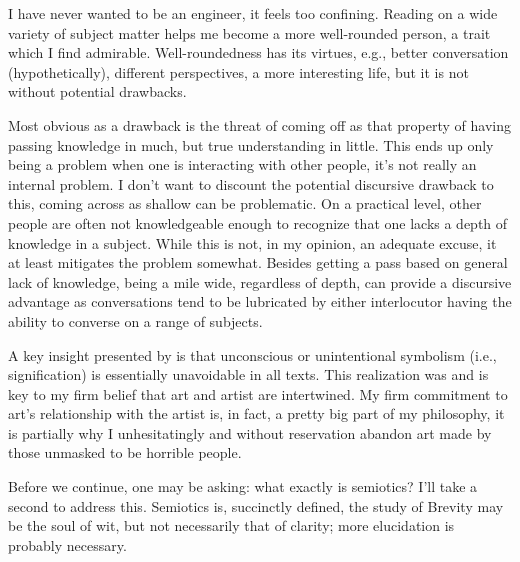 \documentclass[../butidigress.tex]{subfiles}
\begin{document}
I have never wanted to be  an engineer, it feels too confining.
Reading on a wide variety of subject matter helps me become a more well-rounded person, a trait which I find admirable.
Well-roundedness has its virtues, e.g., better conversation (hypothetically), different perspectives, a more interesting life, but it is not without potential drawbacks.

Most obvious as a drawback is the threat of coming off as  that property of having passing knowledge in much, but true understanding in little.
This ends up only being a problem when one is interacting with other people, it's not really an internal problem.
I don't want to discount the potential discursive drawback to this, coming across as shallow can be problematic.
On a practical level, other people are often not knowledgeable enough to recognize that one lacks a depth of knowledge in a subject.
While this is not, in my opinion, an adequate excuse, it at least mitigates the problem somewhat.
Besides getting a pass based on general lack of knowledge, being a mile wide, regardless of depth, can provide a discursive advantage as conversations tend to be lubricated by either interlocutor having the ability to converse on a range of subjects.

A key insight presented by  is that unconscious or unintentional symbolism (i.e., signification) is essentially unavoidable in all texts.
This realization was and is key to my firm belief that art and artist are intertwined.
My firm commitment to art's relationship with the artist is, in fact, a pretty big part of my philosophy, it is partially why I unhesitatingly and without reservation abandon art made by those unmasked to be horrible people.

Before we continue, one may be asking: what exactly is semiotics? I'll take a second to address this.
Semiotics is, succinctly defined, the study of 
Brevity may be the soul of wit, but not necessarily that of clarity; more elucidation is probably necessary.
\end{document}
